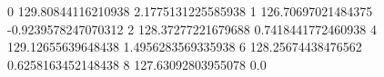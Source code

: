 0 129.80844116210938 2.1775131225585938
1 126.70697021484375 -0.9239578247070312
2 128.37277221679688 0.7418441772460938
4 129.12655639648438 1.4956283569335938
6 128.25674438476562 0.6258163452148438
8 127.63092803955078 0.0
